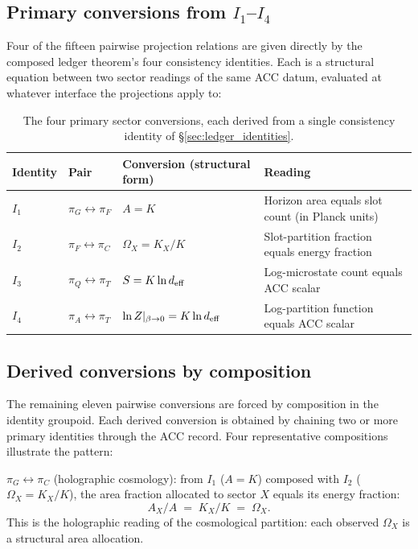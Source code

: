 \documentclass[11pt]{article}
\begin{document}
\subsection{Primary conversions from $I_1$--$I_4$}\label{sec:conversion_primary}

Four of the fifteen pairwise projection relations are given directly by the composed ledger theorem's four consistency identities. Each is a structural equation between two sector readings of the same ACC datum, evaluated at whatever interface the projections apply to:

\begin{table}[h]
\centering
\small
\begin{tabularx}{\textwidth}{@{}l l l X@{}}
\toprule
\textbf{Identity} & \textbf{Pair} & \textbf{Conversion (structural form)} & \textbf{Reading} \\
\midrule
$I_1$ & $\pi_G \leftrightarrow \pi_F$ & $A = K$ & Horizon area equals slot count (in Planck units) \\
\addlinespace[3pt]
$I_2$ & $\pi_F \leftrightarrow \pi_C$ & $\Omega_X = K_X / K$ & Slot-partition fraction equals energy fraction \\
\addlinespace[3pt]
$I_3$ & $\pi_Q \leftrightarrow \pi_T$ & $S = K \ln d_{\rm eff}$ & Log-microstate count equals ACC scalar \\
\addlinespace[3pt]
$I_4$ & $\pi_A \leftrightarrow \pi_T$ & $\ln Z|_{\beta\to 0} = K \ln d_{\rm eff}$ & Log-partition function equals ACC scalar \\
\bottomrule
\end{tabularx}
\caption{The four primary sector conversions, each derived from a single consistency identity of \S\ref{sec:ledger_identities}.}\label{tab:primary_conversions}
\end{table}

\subsection{Derived conversions by composition}\label{sec:conversion_composed}

The remaining eleven pairwise conversions are forced by composition in the identity groupoid. Each derived conversion is obtained by chaining two or more primary identities through the ACC record. Four representative compositions illustrate the pattern:

\smallskip
\noindent\textbf{$\pi_G \leftrightarrow \pi_C$} (holographic cosmology): from $I_1$ ($A = K$) composed with $I_2$ ($\Omega_X = K_X/K$), the area fraction allocated to sector $X$ equals its energy fraction:
\[
A_X / A \;=\; K_X / K \;=\; \Omega_X.
\]
This is the holographic reading of the cosmological partition: each observed $\Omega_X$ is a structural area allocation.
\end{document}
